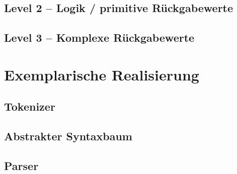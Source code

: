     \begin{figure}[H]
      \centering
      
      \label{fig:interpreter_pack_uml}
    \end{figure}

  \subsection{Level 2 -- Logik / primitive Rückgabewerte}
  \label{ssec:Level 2 -- Logik / primitive Rückgabewerte}

  \subsection{Level 3 -- Komplexe Rückgabewerte}
  \label{ssec:Level 3 -- Komplexe Rückgabewerte}

\section{Exemplarische Realisierung}
\label{sec:Exemplarische Realisierung}
  \subsection{Tokenizer}
  \label{ssec:Tokenizer}

  \subsection{Abstrakter Syntaxbaum}
  \label{ssec:Abstrakter Syntaxbaum}

  \subsection{Parser}
  \label{ssec:Parser}

